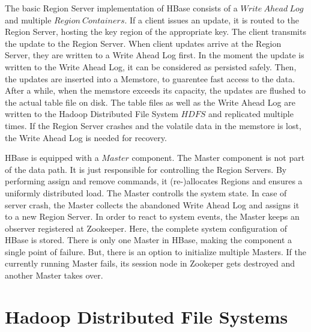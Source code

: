 \documentclass[11pt,a4paper,bibtotoc,idxtotoc,headsepline,footsepline,footexclude,BCOR12mm,DIV13]{scrbook}
\begin{document}
The basic Region Server implementation of HBase consists of a $Write\:Ahead\:Log$ and multiple $Region\:Containers$. If a client issues an update, it is routed to the Region Server, hosting the key region of the appropriate key. The client transmits the update to the Region Server. When client updates arrive at the Region Server, they are written to a Write Ahead Log first. In the moment the update is written to the Write Ahead Log, it can be considered as persisted safely. Then, the updates are inserted into a Memstore, to guarentee fast access to the data. After a while, when the memstore exceeds its capacity, the updates are flushed to the actual table file on disk. The table files as well as the Write Ahead Log are written to the Hadoop Distributed File System $HDFS$ and replicated multiple times. If the Region Server crashes and the volatile data in the memstore is lost, the Write Ahead Log is needed for recovery.

HBase is equipped with a $Master$ component. The Master component is not part of the data path. It is just responsible for controlling the Region Servers. By performing  assign and remove commands, it (re-)allocates Regions and ensures a uniformly distributed load. The Master controlls the system state. In case of server crash, the Master collects the abandoned Write Ahead Log and assigns it to a new Region Server. In order to react to system events, the Master keeps an observer registered at Zookeeper. Here, the complete system configuration of HBase is stored. There is only one Master in HBase, making the component a single point of failure. But, there is an option to initialize multiple Masters. If the currently running Master fails, its session node in Zookeper gets destroyed and another Master takes over. 



\section{Hadoop Distributed File Systems}
\end{document}

